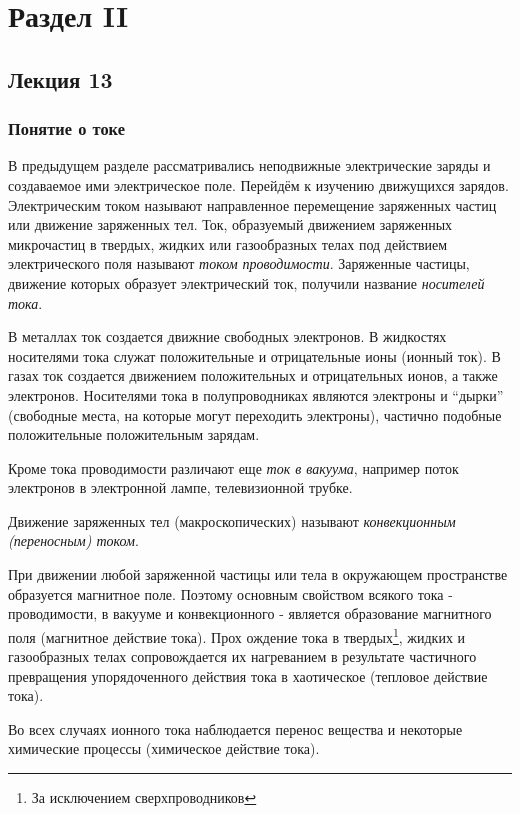 \documentclass[a4paper,10pt]{book}
\begin{document}
\part{Раздел II}
\chapter{Лекция 13}
\section*{Понятие о токе}
В предыдущем разделе рассматривались неподвижные электрические заряды и создаваемое ими электрическое поле. Перейдём 
к изучению движущихся зарядов. Электрическим током называют направленное перемещение заряженных частиц или движение 
заряженных тел. Ток, образуемый движением заряженных микрочастиц в твердых, жидких или газообразных телах под действием
электрического поля называют \emph{током проводимости}. Заряженные частицы, движение которых образует электрический ток,
получили название \emph{носителей тока}.

В металлах ток создается движние свободных электронов. В жидкостях носителями тока служат положительные и отрицательные 
ионы (ионный ток). В газах ток создается движением положительных и отрицательных ионов, а также электронов. Носителями 
тока в полупроводниках являются электроны и ``дырки'' (свободные места, на которые могут переходить электроны), частично 
подобные положительные положительным зарядам.

Кроме тока проводимости различают еще \emph{ток в вакуума}, например поток электронов в электронной лампе, телевизионной 
трубке. 

Движение заряженных тел (макроскопических) называют \emph{конвекционным (переносным) током}.

При движении любой заряженной частицы или тела в окружающем пространстве образуется магнитное поле. Поэтому основным свойством 
всякого тока - проводимости, в вакууме и конвекционного - является образование магнитного поля (магнитное действие тока). Прох
ождение тока в твердых\footnote{За исключением сверхпроводников}, жидких и газообразных телах сопровождается их нагреванием в 
результате частичного превращения упорядоченного действия тока в хаотическое (тепловое действие тока).

Во всех случаях ионного тока наблюдается перенос вещества и некоторые химические процессы (химическое действие тока).
\end{document}
